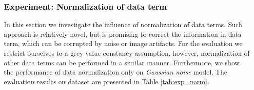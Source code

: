 \subsubsection{Experiment: Normalization of data term}
\label{experiment_normalization_data_term}

In this section we investigate the influence of normalization of data terms. Such approach is relatively novel, but is promising to correct the information in data term, which can be corrupted by noise or image artifacts.  For the evaluation we restrict ourselves to a grey value constancy assumption, however, normalization of other data terms can be performed in a similar manner. Furthermore, we show the performance of data normalization only on \textit{Gaussian noise} model.  The evaluation results on \rub dataset are presented in Table \ref{tab:exp_norm}.

